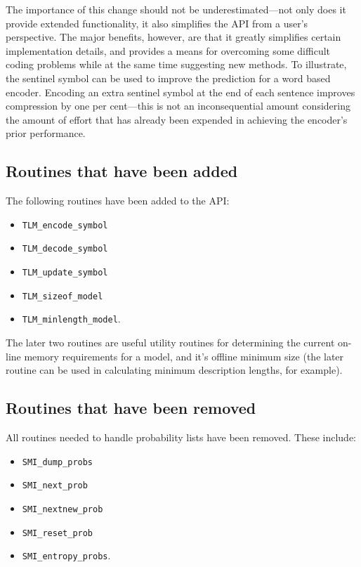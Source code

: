 \documentclass[11pt]{article}
\begin{document}
The importance of this change should not be
underesti\-mated---not only does it provide extended functionality, it also simplifies
the API from a user's perspective. The major benefits, however, are that it greatly
simplifies certain implementation details, and provides a means for overcoming some difficult
coding problems while at the same time suggesting new methods. To illustrate,
the sentinel symbol can be used to improve the prediction for a word based encoder.
Encoding an extra sentinel symbol at the end of each sentence
improves compression by one per cent---this is not an
inconsequential amount considering the amount of effort that has already been expended
in achieving the encoder's prior performance.

\subsection{Routines that have been added}

The following routines have been added to the API:

\begin{itemize}
\item \verb|TLM_encode_symbol|
\item \verb|TLM_decode_symbol|
\item \verb|TLM_update_symbol|
\item \verb|TLM_sizeof_model|
\item \verb|TLM_minlength_model|.
\end{itemize}

The later two routines are useful utility routines for determining the current
on-line memory requirements for a model, and it's offline minimum size (the later
routine can be used in calculating minimum description lengths, for example).

\subsection{Routines that have been removed}

All routines needed to handle probability lists have been removed. These
include:

\begin{itemize}
\item \verb|SMI_dump_probs|
\item \verb|SMI_next_prob|
\item \verb|SMI_nextnew_prob|
\item \verb|SMI_reset_prob|
\item \verb|SMI_entropy_probs|.
\end{itemize}
\end{document}
